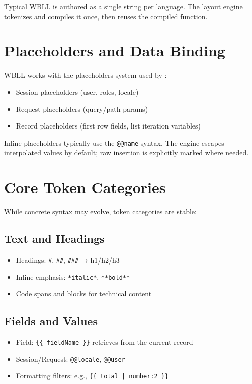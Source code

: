 Typical WBLL is authored as a single string per language. The layout engine tokenizes and compiles it once, then reuses the compiled function.

\section{Placeholders and Data Binding}
\label{sec:wbll-placeholders}

WBLL works with the placeholders system used by \wbpl{}:

\begin{itemize}
  \item Session placeholders (user, roles, locale)
  \item Request placeholders (query/path params)
  \item Record placeholders (first row fields, list iteration variables)
\end{itemize}

Inline placeholders typically use the \verb|@@name| syntax. The engine escapes interpolated values by default; raw insertion is explicitly marked where needed.

\section{Core Token Categories}
\label{sec:wbll-tokens}

While concrete syntax may evolve, token categories are stable:

\subsection{Text and Headings}
\begin{itemize}
  \item Headings: \verb|#|, \verb|##|, \verb|###| → h1/h2/h3
  \item Inline emphasis: \verb|*italic*|, \verb|**bold**|
  \item Code spans and blocks for technical content
\end{itemize}

\subsection{Fields and Values}
\begin{itemize}
  \item Field: \verb|{{ fieldName }}| retrieves from the current record
  \item Session/Request: \verb|@@locale|, \verb|@@user|
  \item Formatting filters: e.g., \verb+{{ total | number:2 }}+
\end{itemize}

